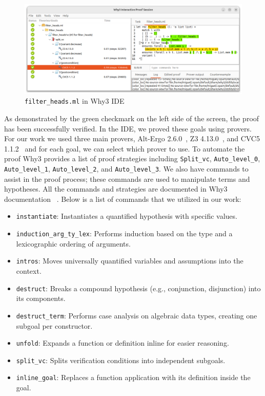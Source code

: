 \documentclass[runningheads]{llncs}
\begin{document}
\begin{figure}[htbp]
  \centering
  \includegraphics[width=1\textwidth]{images/Why3FilterHeads.png}
  \caption{\texttt{filter\_heads.ml} in Why3 IDE}
  \label{fig:Why3FilterHeads}
\end{figure}
As demonstrated by the green checkmark on the left side of the screen, the proof has been successfully verified. 
In the IDE, we proved these goals using provers. For our work we used three main provers,
 Alt-Ergo 2.6.0~\autocite{sasAltErgoSMTSolver}, Z3 4.13.0~\autocite{Z3ProverZ32025}, and CVC5 1.1.2~\autocite{Cvc5} and for each goal, we can select which prover to use. To automate the proof Why3 provides a list of proof strategies including \texttt{Split\_vc}, \texttt{Auto\_level\_0}, \texttt{Auto\_level\_1}, 
\texttt{Auto\_level\_2}, and \texttt{Auto\_level\_3}. We also have commands to assist in the proof process; these commands are used to manipulate terms and hypotheses. All the commands and strategies are documented in Why3 documentation ~\autocite{12TechnicalInformations}.
Below is a list of commands that we utilized in our work:
\begin{itemize}
  \item \texttt{instantiate}: Instantiates a quantified hypothesis with specific values.
  \item \texttt{induction\_arg\_ty\_lex}: Performs induction based on the type and a lexicographic ordering of arguments.
  \item \texttt{intros}: Moves universally quantified variables and assumptions into the context.
  \item \texttt{destruct}: Breaks a compound hypothesis (e.g., conjunction, disjunction) into its components.
  \item \texttt{destruct\_term}: Performs case analysis on algebraic data types, creating one subgoal per constructor.
  \item \texttt{unfold}: Expands a function or definition inline for easier reasoning.
  \item \texttt{split\_vc}: Splits verification conditions into independent subgoals.
  \item \texttt{inline\_goal}: Replaces a function application with its definition inside the goal.
\end{itemize}
\end{document}

